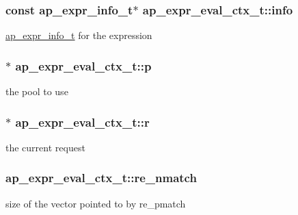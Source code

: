 \subsubsection[{\texorpdfstring{info}{info}}]{\setlength{\rightskip}{0pt plus 5cm}const {\bf ap\+\_\+expr\+\_\+info\+\_\+t}$\ast$ ap\+\_\+expr\+\_\+eval\+\_\+ctx\+\_\+t\+::info}\hypertarget{structap__expr__eval__ctx__t_afb8cb1306a7d14f55885f89bd895b679}{}\label{structap__expr__eval__ctx__t_afb8cb1306a7d14f55885f89bd895b679}
\hyperlink{structap__expr__info__t}{ap\+\_\+expr\+\_\+info\+\_\+t} for the expression 
\subsubsection[{\texorpdfstring{p}{p}}]{$\ast$ ap\+\_\+expr\+\_\+eval\+\_\+ctx\+\_\+t\+::p}\hypertarget{structap__expr__eval__ctx__t_a1f4c86e95a88939389b0ffcc43d2a014}{}\label{structap__expr__eval__ctx__t_a1f4c86e95a88939389b0ffcc43d2a014}
the pool to use 
\subsubsection[{\texorpdfstring{r}{r}}]{$\ast$ ap\+\_\+expr\+\_\+eval\+\_\+ctx\+\_\+t\+::r}\hypertarget{structap__expr__eval__ctx__t_a150a98e94f240dc8ffe5dd451f0ce388}{}\label{structap__expr__eval__ctx__t_a150a98e94f240dc8ffe5dd451f0ce388}
the current request 
\subsubsection[{\texorpdfstring{re\+\_\+nmatch}{re_nmatch}}]{ ap\+\_\+expr\+\_\+eval\+\_\+ctx\+\_\+t\+::re\+\_\+nmatch}\hypertarget{structap__expr__eval__ctx__t_a7fca153e0343b8b9bc5cb0c9d4b8249d}{}\label{structap__expr__eval__ctx__t_a7fca153e0343b8b9bc5cb0c9d4b8249d}
size of the vector pointed to by re\+\_\+pmatch 
